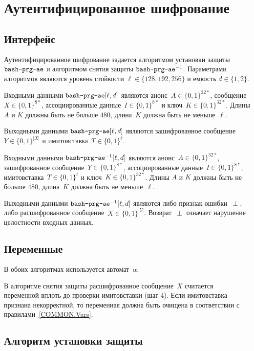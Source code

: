 \section{Аутентифицированное шифрование}\label{PRG.AE}

\subsection{Интерфейс}\label{PRG.AE.IFace}

Аутентифицированное шифрование задается алгоритмом установки 
защиты $\texttt{bash-prg-ae}$ и алгоритмом снятия защиты
$\texttt{bash-prg-ae}^{-1}$. Параметрами алгоритмов являются 
уровень стойкости $\ell\in\{128,192,256\}$ и емкость $d\in\{1,2\}$. 

Входными данными $\texttt{bash-prg-ae}[\ell,d]$ являются 
анонс~$A\in\{0,1\}^{32*}$, сообщение~$X\in\{0,1\}^{8*}$, ассоциированные
данные~$I\in\{0,1\}^{8*}$ и ключ~$K\in\{0,1\}^{32*}$.
%
Длины $A$ и $K$ должны быть не больше $480$, длина~$K$ должна быть не 
меньше~$\ell$.

Выходными данными $\texttt{bash-prg-ae}[\ell,d]$ являются 
зашифрованное сообщение~$Y\in\{0,1\}^{|X|}$ и имитовставка~$T\in\{0,1\}^\ell$.

Входными данными $\texttt{bash-prg-ae}^{-1}[\ell,d]$ являются 
анонс~$A\in\{0,1\}^{32*}$, зашифрованное сообщение~$Y\in\{0,1\}^{8*}$, 
ассоциированные данные~$I\in\{0,1\}^{8*}$, имитовставка~$T\in\{0,1\}^\ell$ 
и ключ~$K\in\{0,1\}^{32*}$.
%
Длины $A$ и $K$ должны быть не больше $480$, длина~$K$ должна быть не 
меньше~$\ell$.

Выходными данными $\texttt{bash-prg-ae}^{-1}[\ell,d]$ являются 
либо признак ошибки~$\perp$, либо расшифрованное сообщение~$X\in\{0,1\}^{|Y|}$. 
%
Возврат~$\perp$ означает нарушение целостности входных данных.

\subsection{Переменные}\label{PRG.AE.Vars}

В обоих алгоритмах используется автомат~$\alpha$.

В алгоритме снятия защиты расшифрованное сообщение~$X$
считается переменной вплоть до проверки имитовставки (шаг 4).
Если имитовставка признана некорректной, то переменная должна быть 
очищена в соответствии с правилами~\ref{COMMON.Vars}.

\subsection{Алгоритм установки защиты}\label{PRG.AE.Wrap}

